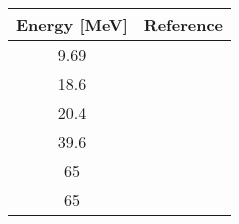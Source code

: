 \begin{tabular}{|c||c|} 
    \hline 
    \bf{Energy [MeV]} & \bf{Reference} \\
    \hline
    \hline 
    9.69 & \cite{Greenlees71}\\
    18.6 & \cite{Kossanyi-Demay67}\\
    20.4 & \cite{Wassenaar89}\\
    39.6 & \cite{Liers70}\\
    65 & \cite{Noro81}\\
    65 & \cite{Sakaguchi81}\\
    \hline
\end{tabular}
